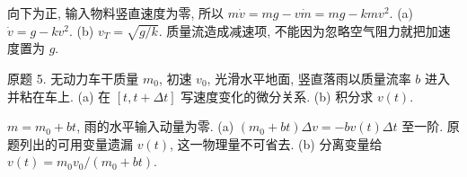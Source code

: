 \begin{solution}
向下为正, 输入物料竖直速度为零, 所以 $m\dot v=mg-v\dot m=mg-kmv^2$. (a) $\dot v=g-kv^2$. (b) $v_T=\sqrt{g/k}$. 质量流造成减速项, 不能因为忽略空气阻力就把加速度置为 $g$.
\end{solution}
\begin{exercise}
原题 5. 无动力车干质量 $m_0$, 初速 $v_0$, 光滑水平地面, 竖直落雨以质量流率 $b$ 进入并粘在车上. (a) 在 $[t,t+\Delta t]$ 写速度变化的微分关系. (b) 积分求 $v(t)$.
\end{exercise}
\begin{solution}
$m=m_0+bt$, 雨的水平输入动量为零. (a) $(m_0+bt)\Delta v=-bv(t)\Delta t$ 至一阶. 原题列出的可用变量遗漏 $v(t)$, 这一物理量不可省去. (b) 分离变量给 $v(t)=m_0v_0/(m_0+bt)$.
\end{solution}
